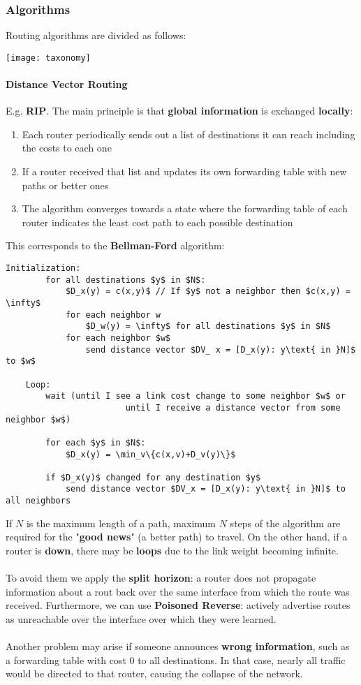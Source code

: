\subsubsection{Algorithms}
Routing algorithms are divided as follows:
\begin{center}
	\texttt{[image: taxonomy]}
\end{center}

\paragraph{Distance Vector Routing} E.g. \textbf{RIP}. The main principle is that \textbf{global information} is exchanged \textbf{locally}:
\begin{enumerate}
	\item Each router periodically sends out a list of destinations it can reach including the costs to each one
	\item If a router received that list and updates its own forwarding table with new paths or better ones
	\item The algorithm converges towards a state where the forwarding table of each router indicates the least cost path to each possible destination
\end{enumerate}
\newpage
\noindent This corresponds to the \textbf{Bellman-Ford} algorithm:
\begin{lstlisting}[mathescape=true]
	Initialization:
		for all destinations $y$ in $N$:
			$D_x(y) = c(x,y)$ // If $y$ not a neighbor then $c(x,y) = \infty$
			for each neighbor w
				$D_w(y) = \infty$ for all destinations $y$ in $N$
			for each neighbor $w$
				send distance vector $DV_ x = [D_x(y): y\text{ in }N]$ to $w$
				
	Loop:
		wait (until I see a link cost change to some neighbor $w$ or 
						until I receive a distance vector from some neighbor $w$)

		for each $y$ in $N$:
			$D_x(y) = \min_v\{c(x,v)+D_v(y)\}$
			
		if $D_x(y)$ changed for any destination $y$
			send distance vector $DV_x = [D_x(y): y\text{ in }N]$ to all neighbors
\end{lstlisting}

If $N$ is the maximum length of a path, maximum $N$ steps of the algorithm are required for the "\textbf{good news}" (a better path) to travel. On the other hand, if a router is \textbf{down}, there may be \textbf{loops} due to the link weight becoming infinite. \\\\
To avoid them we apply the \textbf{split horizon}: a router does not propagate information about a rout back over the same interface from which the route was received. Furthermore, we can use \textbf{Poisoned Reverse}: actively advertise routes as unreachable over the interface over which they were learned.\\\\
Another problem may arise if someone announces \textbf{wrong information}, such as a forwarding table with cost $0$ to all destinations. In that case, nearly all traffic would be directed to that router, causing the collapse of the network.

